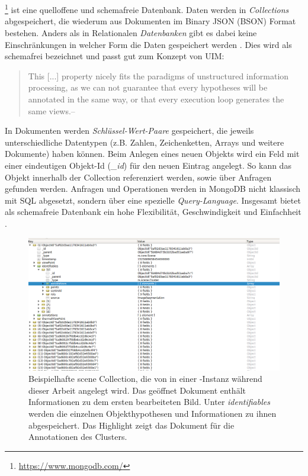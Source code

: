 \section{\mongodb}
\label{sec:mongodb}
\mongodb\footnote{\url{https://www.mongodb.com/}} ist eine quelloffene und schemafreie Datenbank. Daten werden in \textit{Collections} abgespeichert, die wiederum aus Dokumenten im Binary JSON (BSON) Format bestehen. Anders als in Relationalen \textit{Datenbanken} gibt es dabei keine Einschränkungen in welcher Form die Daten gespeichert werden \cite{mongoVsOracle}. Dies wird als schemafrei bezeichnet und passt gut zum Konzept von UIM:
\begin{quote}
\glqq This [...] property nicely fits the paradigms of unstructured information processing, as we can not guarantee that every hypotheses will be annotated in the same way, or that every execution loop generates the same views.\grqq \hfill -- \cite{episodicMemory}
\end{quote}
In Dokumenten werden \textit{Schlüssel-Wert-Paare} gespeichert, die jeweils unterschiedliche Datentypen (z.B. Zahlen, Zeichenketten, Arrays und weitere Dokumente) haben können. Beim Anlegen eines neuen Objekts wird ein Feld mit einer eindeutigen Objekt-Id (\textit{\_id}) für den neuen Eintrag angelegt. So kann das Objekt innerhalb der Collection referenziert werden, sowie über Anfragen gefunden werden. Anfragen und Operationen werden in MongoDB nicht klassisch mit SQL abgesetzt, sondern über eine spezielle \textit{Query-Language}. Insgesamt bietet \mongodb als schemafreie Datenbank ein hohe Flexibilität, Geschwindigkeit und Einfachheit \cite{mongoVsOracle}. \par

\begin{figure}
\includegraphics[width=\textwidth]{img/chapter3/mongoPic.png}
\caption[Die scene Collection einer \mongodb-Instanz]{Beispielhafte scene Collection, die von \robosherlock in einer \mongodb-Instanz während dieser Arbeit angelegt wird. Das geöffnet Dokument enthält Informationen zu dem ersten bearbeiteten Bild. Unter \textit{identifiables} werden die einzelnen Objekthypothesen und Informationen zu ihnen abgespeichert. Das Highlight zeigt das Dokument für die Annotationen des Clusters.}
\end{figure}

